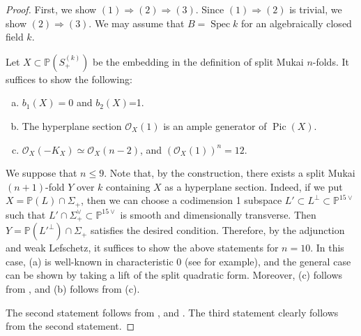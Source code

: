 \documentclass[autodetect-engine, a4paper]{amsart}
\theoremstyle{definition}
\def\P{{\mathbb P}}
\def\cO{\mathcal{O}}
\DeclareMathOperator\Pic{\mathrm{Pic}}
\DeclareMathOperator\Spec{\mathrm{Spec}}
\newcommand{\cred}{\color{black}}
\begin{document}
\begin{proof}
First, we show $(1) \Rightarrow (2) \Rightarrow (3)$. Since $(1) \Rightarrow (2)$ is trivial, we show $(2) \Rightarrow (3)$.
We may assume that $B = \Spec k$ for an algebraically closed field $k$.
{\cred Let $X \subset \P(S_{+}^{(k)})$ be the embedding in the definition of split Mukai $n$-folds.
It suffices to show the following: 
\begin{enumerate}[(a)]
\item 
$b_{1} (X) =0$ and $b_{2} (X)$=1. 
\item 
The hyperplane section $\cO_{X}(1)$ is an ample generator of $\Pic (X)$.
\item
$\cO_{X}(-K_{X}) \simeq \cO_{X}(n-2)$, and $(\cO_{X}(1))^n =12$.
\end{enumerate}
}
{\cred
We suppose that $n \leq 9$.
Note that, by the construction, there exists a split Mukai $(n+1)$-fold $Y$ over $k$ containing $X$ as a hyperplane section.
Indeed, if we put $X = \P(L) \cap \Sigma_{+}$, then we can choose a codimension 1 subspace 
$L' \subset L^{\perp} \subset \P^{15 \vee}$ such that 
$L' \cap \Sigma_{+}^{\vee} \subset \P^{15 \vee}$ is smooth and dimensionally transverse. Then 
$Y= \P(L'^{\perp}) \cap \Sigma_{+}$ satisfies the desired condition.
Therefore, by the adjunction and weak Lefschetz, it suffices to show the above statements for $n=10.$
In this case, (a) is well-known in characteristic 0 (see \cite[Corollary 3.8]{Kuznetsovspinor} for example), and the general case can be shown by taking a lift of the split quadratic form.
Moreover, (c) follows from \cite[Proposition 2.1]{Mukaicurve}, 
and (b) follows from (c).
}

The second statement follows from \cite{Mukaimukain-fold}, \cite{Amb99} and \cite{Mella}.
The third statement clearly follows from the second statement.
\end{proof}
\end{document}
